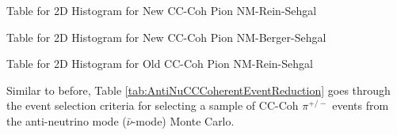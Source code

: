 \documentclass[11pt]{article}
\begin{document}
\newpage
\begin{landscape}
\begin{table}
\centering
\caption{Table for 2D Histogram for New CC-Coh Pion NM-Rein-Sehgal}
\begin{adjustbox}{width=\paperwidth}
\end{adjustbox}
\end{table}
\end{landscape}

\newpage
\begin{landscape}
\begin{table}
\centering
\caption{Table for 2D Histogram for New CC-Coh Pion NM-Berger-Sehgal}
\begin{adjustbox}{width=\paperwidth}
\end{adjustbox}
\end{table}
\end{landscape}

\newpage
\begin{landscape}
\begin{table}
\centering
\caption{Table for 2D Histogram for Old CC-Coh Pion NM-Rein-Sehgal}
\begin{adjustbox}{width=\paperwidth}
\end{adjustbox}
\end{table}
\end{landscape}



Similar to before, Table \ref{tab:AntiNuCCCoherentEventReduction} goes through the event selection criteria for selecting a sample of CC-Coh $\pi^{+/-}$ events from the anti-neutrino mode ($\bar{\nu}$-mode) Monte Carlo.
\end{document}
